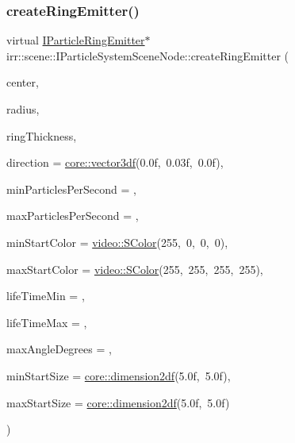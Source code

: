 \subsubsection{\texorpdfstring{create\+Ring\+Emitter()}{createRingEmitter()}\hspace{0.1cm}{\footnotesize\ttfamily [1/2]}}
{\footnotesize\ttfamily virtual \hyperlink{classirr_1_1scene_1_1IParticleRingEmitter}{I\+Particle\+Ring\+Emitter}$\ast$ irr\+::scene\+::\+I\+Particle\+System\+Scene\+Node\+::create\+Ring\+Emitter (\begin{DoxyParamCaption}\item[{const \hyperlink{namespaceirr_1_1core_ae6e2b2a6c552833ebbd5b7463d03586b}{core\+::vector3df} \&}]{center,  }\item[{\hyperlink{namespaceirr_a0277be98d67dc26ff93b1a6a1d086b07}{f32}}]{radius,  }\item[{\hyperlink{namespaceirr_a0277be98d67dc26ff93b1a6a1d086b07}{f32}}]{ring\+Thickness,  }\item[{const \hyperlink{namespaceirr_1_1core_ae6e2b2a6c552833ebbd5b7463d03586b}{core\+::vector3df} \&}]{direction = {\ttfamily \hyperlink{namespaceirr_1_1core_ae6e2b2a6c552833ebbd5b7463d03586b}{core\+::vector3df}(0.0f,~0.03f,~0.0f)},  }\item[{\hyperlink{namespaceirr_a0416a53257075833e7002efd0a18e804}{u32}}]{min\+Particles\+Per\+Second = {},  }\item[{\hyperlink{namespaceirr_a0416a53257075833e7002efd0a18e804}{u32}}]{max\+Particles\+Per\+Second = {},  }\item[{const \hyperlink{classirr_1_1video_1_1SColor}{video\+::\+S\+Color} \&}]{min\+Start\+Color = {\ttfamily \hyperlink{classirr_1_1video_1_1SColor}{video\+::\+S\+Color}(255,~0,~0,~0)},  }\item[{const \hyperlink{classirr_1_1video_1_1SColor}{video\+::\+S\+Color} \&}]{max\+Start\+Color = {\ttfamily \hyperlink{classirr_1_1video_1_1SColor}{video\+::\+S\+Color}(255,~255,~255,~255)},  }\item[{\hyperlink{namespaceirr_a0416a53257075833e7002efd0a18e804}{u32}}]{life\+Time\+Min = {},  }\item[{\hyperlink{namespaceirr_a0416a53257075833e7002efd0a18e804}{u32}}]{life\+Time\+Max = {},  }\item[{\hyperlink{namespaceirr_ac66849b7a6ed16e30ebede579f9b47c6}{s32}}]{max\+Angle\+Degrees = {},  }\item[{const \hyperlink{namespaceirr_1_1core_a54f0e5b7416e6dce5a0f6213f00a580f}{core\+::dimension2df} \&}]{min\+Start\+Size = {\ttfamily \hyperlink{namespaceirr_1_1core_a54f0e5b7416e6dce5a0f6213f00a580f}{core\+::dimension2df}(5.0f,~5.0f)},  }\item[{const \hyperlink{namespaceirr_1_1core_a54f0e5b7416e6dce5a0f6213f00a580f}{core\+::dimension2df} \&}]{max\+Start\+Size = {\ttfamily \hyperlink{namespaceirr_1_1core_a54f0e5b7416e6dce5a0f6213f00a580f}{core\+::dimension2df}(5.0f,~5.0f)} }\end{DoxyParamCaption})\hspace{0.3cm}{\ttfamily [pure virtual]}}



